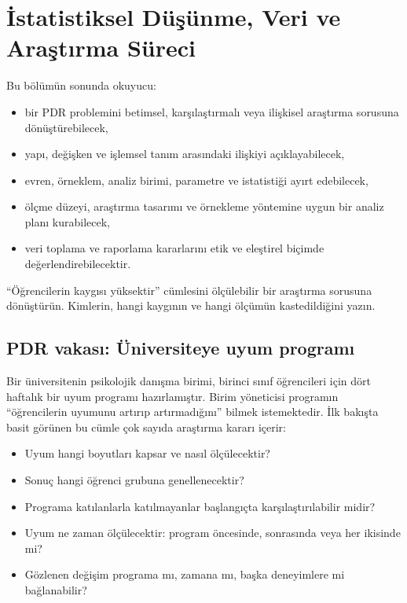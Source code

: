 \chapter{İstatistiksel Düşünme, Veri ve Araştırma Süreci}

\begin{hedefler}
Bu bölümün sonunda okuyucu:
\begin{itemize}
  \item bir PDR problemini betimsel, karşılaştırmalı veya ilişkisel araştırma sorusuna dönüştürebilecek,
  \item yapı, değişken ve işlemsel tanım arasındaki ilişkiyi açıklayabilecek,
  \item evren, örneklem, analiz birimi, parametre ve istatistiği ayırt edebilecek,
  \item ölçme düzeyi, araştırma tasarımı ve örnekleme yöntemine uygun bir analiz planı kurabilecek,
  \item veri toplama ve raporlama kararlarını etik ve eleştirel biçimde değerlendirebilecektir.
\end{itemize}
\end{hedefler}

\begin{hazirlik}
``Öğrencilerin kaygısı yüksektir'' cümlesini ölçülebilir bir araştırma
sorusuna dönüştürün. Kimlerin, hangi kaygının ve hangi ölçümün kastedildiğini
yazın.
\end{hazirlik}

\section{PDR vakası: Üniversiteye uyum programı}

Bir üniversitenin psikolojik danışma birimi, birinci sınıf öğrencileri için
dört haftalık bir uyum programı hazırlamıştır. Birim yöneticisi programın
``öğrencilerin uyumunu artırıp artırmadığını'' bilmek istemektedir. İlk bakışta
basit görünen bu cümle çok sayıda araştırma kararı içerir:

\begin{itemize}
  \item Uyum hangi boyutları kapsar ve nasıl ölçülecektir?
  \item Sonuç hangi öğrenci grubuna genellenecektir?
  \item Programa katılanlarla katılmayanlar başlangıçta karşılaştırılabilir midir?
  \item Uyum ne zaman ölçülecektir: program öncesinde, sonrasında veya her ikisinde mi?
  \item Gözlenen değişim programa mı, zamana mı, başka deneyimlere mi bağlanabilir?
\end{itemize}

